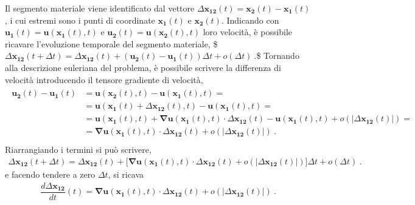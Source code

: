 \documentclass[letterpaper,10pt,italian]{jupyterBook}
\begin{document}
\sphinxAtStartPar
Il segmento materiale viene identificato dal vettore
\(\Delta\mathbf{x_{12}}(t) = \mathbf{x_2}(t) - \mathbf{x_1}(t)\), i cui estremi sono i
punti di coordinate \(\mathbf{x_1}(t)\) e \(\mathbf{x_2}(t)\). Indicando con
\(\mathbf{u_1}(t) = \mathbf{u}(\mathbf{x_1}(t),t)\) e
\(\mathbf{u_2}(t) = \mathbf{u}(\mathbf{x_2}(t),t)\) loro velocità, è possibile
ricavare l’evoluzione temporale del segmento materiale,
\$\(\Delta\mathbf{x_{12}}(t+\Delta t) = \Delta\mathbf{x_{12}}(t) + \left( \mathbf{u_2}(t) - \mathbf{u_1}(t) \right) \Delta t + o(\Delta t) \ .\)\$
Tornando alla descrizione euleriana del problema, è possibile scrivere
la differenza di velocità introducendo il tensore gradiente di velocità,
\begin{equation*}
\begin{split}\begin{aligned}
 \mathbf{u_2}(t) - \mathbf{u_1}(t) & = \mathbf{u}(\mathbf{x_2}(t),t) - \mathbf{u}(\mathbf{x_1}(t),t) = \\
 & = \mathbf{u}\left(\mathbf{x_1}(t)+\Delta\mathbf{x_{12}}(t),t\right) - \mathbf{u}\left(\mathbf{x_1}(t),t\right) = \\
 & = \mathbf{u}\left(\mathbf{x_1}(t),t\right) + \mathbf{\nabla}\mathbf{u}\left(\mathbf{x_1}(t),t\right) \cdot \Delta\mathbf{x_{12}}(t) - \mathbf{u}\left(\mathbf{x_1}(t),t\right) + o(|\Delta\mathbf{x_{12}}(t)|) = \\
 & = \mathbf{\nabla}\mathbf{u}\left(\mathbf{x_1}(t),t\right) \cdot \Delta\mathbf{x_{12}}(t) + o(|\Delta\mathbf{x_{12}}(t)|) \ . \\
 \end{aligned}\end{split}
\end{equation*}
\sphinxAtStartPar
Riarrangiando i termini si può scrivere,
\begin{equation*}
\begin{split}\label{eqn:cin:material-segm}
 \Delta\mathbf{x_{12}}(t+\Delta t) = \Delta\mathbf{x_{12}}(t) + 
 \big[ \mathbf{\nabla}\mathbf{u}\left(\mathbf{x_1}(t),t\right) \cdot \Delta\mathbf{x_{12}}(t) + o(|\Delta\mathbf{x_{12}}(t)|) \big] \Delta t + o(\Delta t) \ .\end{split}
\end{equation*}
\sphinxAtStartPar
e facendo tendere a zero \(\Delta t\), si ricava
\begin{equation*}
\begin{split}\dfrac{d \Delta\mathbf{x_{12}}}{d t}(t) = \mathbf{\nabla}\mathbf{u}\left(\mathbf{x_1}(t),t\right) \cdot \Delta\mathbf{x_{12}}(t) + o(|\Delta\mathbf{x_{12}}(t)|) \ .\end{split}
\end{equation*}
\end{document}
